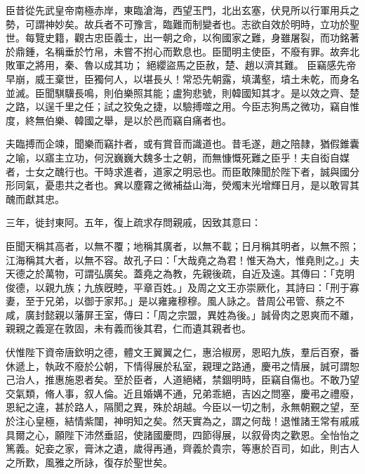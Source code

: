 \begin{pinyinscope}
臣昔從先武皇帝南極赤岸，東臨滄海，西望玉門，北出玄塞，伏見所以行軍用兵之勢，可謂神妙矣。故兵者不可豫言，臨難而制變者也。志欲自效於明時，立功於聖世。每覽史籍，觀古忠臣義士，出一朝之命，以徇國家之難，身雖屠裂，而功銘著於鼎鍾，名稱垂於竹帛，未嘗不拊心而歎息也。臣聞明主使臣，不廢有罪。故奔北敗軍之將用，秦、魯以成其功；
絕纓盜馬之臣赦，楚、趙以濟其難。
臣竊感先帝早崩，威王棄世，臣獨何人，以堪長乆！常恐先朝露，填溝壑，墳土未乾，而身名並滅。臣聞騏驥長鳴，則伯樂照其能；盧狗悲號，則韓國知其才。是以效之齊、楚之路，以逞千里之任；試之狡兔之捷，以驗搏噬之用。今臣志狗馬之微功，竊自惟度，終無伯樂、韓國之舉，是以於邑而竊自痛者也。


夫臨搏而企竦，聞樂而竊抃者，或有賞音而識道也。昔毛遂，趙之陪隷，猶假錐囊之喻，以寤主立功，何況巍巍大魏多士之朝，而無慷慨死難之臣乎！夫自衒自媒者，士女之醜行也。干時求進者，道家之明忌也。而臣敢陳聞於陛下者，誠與國分形同氣，憂患共之者也。兾以塵霧之微補益山海，熒燭末光增輝日月，是以敢冐其醜而獻其忠。


三年，徙封東阿。五年，復上疏求存問親戚，因致其意曰：


臣聞天稱其高者，以無不覆；地稱其廣者，以無不載；日月稱其明者，以無不照；江海稱其大者，以無不容。故孔子曰：「大哉堯之為君！惟天為大，惟堯則之。」夫天德之於萬物，可謂弘廣矣。蓋堯之為教，先親後疏，自近及遠。其傳曰：「克明俊德，以親九族；九族旣睦，平章百姓。」及周之文王亦崇厥化，其詩曰：「刑于寡妻，至于兄弟，以御于家邦。」是以雍雍穆穆。風人詠之。昔周公弔管、蔡之不咸，廣封懿親以藩屏王室，傳曰：「周之宗盟，異姓為後。」誠骨肉之恩爽而不離，親親之義寔在敦固，未有義而後其君，仁而遺其親者也。


伏惟陛下資帝唐欽明之德，體文王翼翼之仁，惠洽椒房，恩昭九族，羣后百寮，番休遞上，執政不廢於公朝，下情得展於私室，親理之路通，慶弔之情展，誠可謂恕己治人，推惠施恩者矣。至於臣者，人道絕緒，禁錮明時，臣竊自傷也。不敢乃望交氣類，脩人事，叙人倫。近且婚媾不通，兄弟乖絕，吉凶之問塞，慶弔之禮廢，恩紀之違，甚於路人，隔閡之異，殊於胡越。今臣以一切之制，永無朝覲之望，至於注心皇極，結情紫闥，神明知之矣。然天實為之，謂之何哉！退惟諸王常有戚戚具爾之心，願陛下沛然垂詔，使諸國慶問，四節得展，以叙骨肉之歡恩。全怡怡之篤義。妃妾之家，膏沐之遺，歲得再通，齊義於貴宗，等惠於百司，如此，則古人之所歎，風雅之所詠，復存於聖世矣。



\end{pinyinscope}
